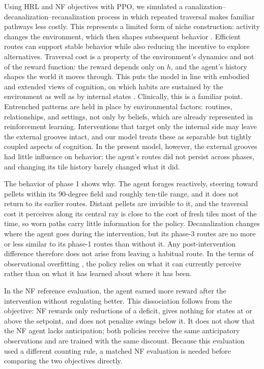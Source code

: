 \documentclass[12pt,fleqn]{article}
\begin{document}
Using HRL and NF objectives with PPO, we simulated a canalization--decanalization--recanalization process in which repeated traversal makes familiar pathways less costly. This represents a limited form of niche construction: activity changes the environment, which then shapes subsequent behavior \cite{pio-lopez_scale-free_2025, lyon_reframing_2021}. Efficient routes can support stable behavior while also reducing the incentive to explore alternatives. Traversal cost is a property of the environment's dynamics and not of the reward function: the reward depends only on $h$, and the agent's history shapes the world it moves through. This puts the model in line with embodied and extended views of cognition, on which habits are sustained by the environment as well as by internal states \cite{lyon_reframing_2021, hipolito_pattern_2023}. Clinically, this is a familiar point. Entrenched patterns are held in place by environmental factors: routines, relationships, and settings, not only by beliefs, which are already represented in reinforcement learning. Interventions that target only the internal side may leave the external grooves intact, and our model treats these as separable but tightly coupled aspects of cognition. In the present model, however, the external grooves had little influence on behavior: the agent's routes did not persist across phases, and changing its tile history barely changed what it did.

The behavior of phase 1 shows why. The agent forages reactively, steering toward pellets within its 90-degree field and roughly ten-tile range, and it does not return to its earlier routes. Distant pellets are invisible to it, and the traversal cost it perceives along its central ray is close to the cost of fresh tiles most of the time, so worn paths carry little information for the policy. Decanalization changes where the agent goes during the intervention, but its phase-3 routes are no more or less similar to its phase-1 routes than without it. Any post-intervention difference therefore does not arise from leaving a habitual route. In the terms of observational overfitting \cite{song_observational_2019}, the policy relies on what it can currently perceive rather than on what it has learned about where it has been.

In the NF reference evaluation, the agent earned more reward after the intervention without regulating better. This dissociation follows from the objective: NF rewards only reductions of a deficit, gives nothing for states at or above the setpoint, and does not penalize swings below it. It does not show that the NF agent lacks anticipation; both policies receive the same anticipatory observations and are trained with the same discount. Because this evaluation used a different counting rule, a matched NF evaluation is needed before comparing the two objectives directly.
\end{document}
